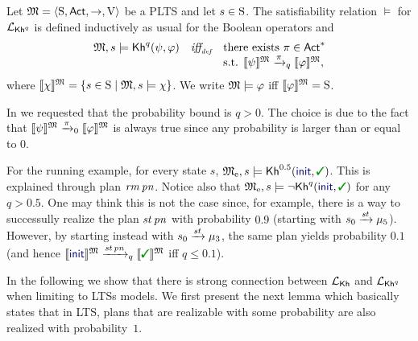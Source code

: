 \begin{definition}\label{def:semantics:PKh}
  Let $\model = \tup{\S,\Act,\ra,\V}$ be a PLTS and let $s\in\S$.  The
  satisfiability relation $\models$ for $\PKh$ is defined inductively 
  as usual for the Boolean operators and
  \[
  \begin{array}{l@{\ \ \ }c@{\ \ \  }l}
    \model, s \models \kh^q(\psi,\varphi) & \iffdef & \text{there exists } \plan \in \Act^*  \\
    & & \text{s.t. } \truthset{\model}{\psi} \reach{\plan}_q \truthset{\model}{\varphi}, 
  \end{array}
  \]
  where $\truthset{\model}{\chi} = \csetsc{s\in\S}{\model,s\models\chi}$.
  We write $\model\models\varphi$ iff $\truthset{\model}{\varphi}=\S$.
\end{definition}

In  we requested that the probability bound is
${q>0}$.  The choice is due to the fact that $\truthset{\model}{\psi}
\reach{\plan}_0 \truthset{\model}{\varphi}$ is always true since any
probability is larger than or equal to $0$.

\begin{example}\label{ex:running:pkh}
  For the running example, for every state $s$,
  $\modelex, s \models \kh^{0.5}(\init,\goal)$.
  This is explained through plan $\ramp\,\panic$.
  Notice also that $\modelex, s \models \neg \kh^q(\init,\goal)$ for
  any $q>0.5$. One may think this is not the case since, for example,
  there is a way to successully realize the plan $\stairs\,\panic$
  with probability $0.9$ (starting with $s_0\reach{\stairs}\mu_5$).
  However, by starting instead with $s_0\reach{\stairs}\mu_3$, the
  same plan yields probability $0.1$ (and hence
  $\truthset{\model}{\init}\reach{\stairs\,\panic}_q\truthset{\model}{\goal}$
  iff $q\leq 0.1$).
\end{example}

In the following we show that there is strong connection between
$\Khlogic$ and $\PKh$ when limiting to LTSs models. We first present
the next lemma which basically states that in LTS, plans that are
realizable with some probability are also realized with
probability~$1$.

